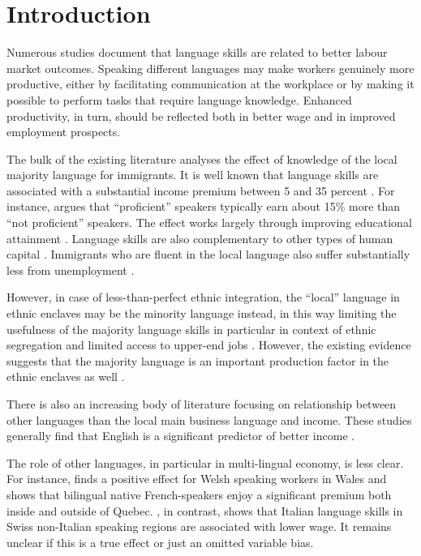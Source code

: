 \documentclass[12pt, a4paper]{article}
\begin{document}
\section{Introduction}
\label{sec:introduction}
Numerous studies document that language skills are related to better
labour market outcomes.
Speaking different languages may make workers genuinely more
productive, either by facilitating communication at the workplace
or by making it possible to perform
tasks that require language knowledge.
Enhanced productivity, in turn, should be reflected both in better wage
and in improved employment prospects.

The bulk of the existing literature analyses the effect of knowledge
of the local majority language for immigrants.  It is well known that
language skills are associated with a substantial income premium
between 5 and 35 percent
\citep{Chiswick1995,bleakley+chin2004,shields+price2002,leslie+lindley2001,chiswick+miller2002,Chiswick2003,Chiswick2010,Chiswick2015, Dustmann2003}.  For
instance, \citet{chiswick2008} argues that ``proficient'' speakers
typically earn about 15\% more than ``not proficient'' speakers.
The effect works largely through improving educational attainment
\citep{bleakley+chin2004,rooth+saarela2007native}.  Language skills are
also complementary to other types of human capital
\citep{chiswick+miller2007}.
Immigrants who are fluent in the local language also suffer
substantially less from unemployment \citep{shields+price2002, Dustmann2003}.



However, in case of less-than-perfect ethnic integration, the ``local''
language in ethnic enclaves may be the minority language instead, in
this way limiting the usefulness of the majority language skills
\citep{chiswick+miller2002,hwang+2010} in particular in context of ethnic segregation and
limited access to upper-end jobs \citep{Toomet2011}.  However, the
existing evidence suggests that the majority language is
an important production factor in the ethnic enclaves as well
\citep{zhou+logan1989, clark+drinkwater2000}.


There is also an increasing body of literature focusing on relationship
between other languages than the local main business language and
income.  These studies generally find
that English is a significant predictor of better income
\citep{Lang2009, Casale2011, Toomet2011, Williams2011, azam+2013EDandCC, isphording2013, fabo+2017E}.


The role of other languages, in particular in multi-lingual economy, is
less clear.  For instance,
\cite{Drinkwater1997} finds
a positive effect for Welsh speaking workers in
Wales and \cite{Armstrong2015} shows that bilingual native French-speakers enjoy
a significant premium both inside and outside of Quebec.
\citet{FrancoisGrin1998}, in contrast,
shows that Italian language skills in Swiss non-Italian speaking
regions are associated with lower wage.  It remains unclear if
this is a true effect or just an omitted variable bias.
\end{document}
